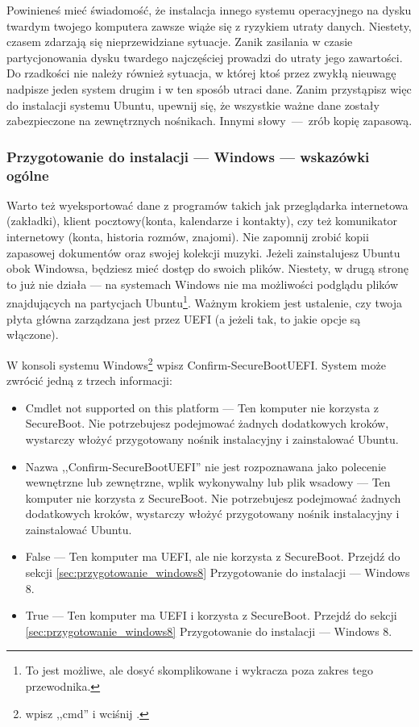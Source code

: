 \label{sec:przygotowanie_windows}Powinieneś mieć świadomość, że instalacja innego systemu operacyjnego na dysku twardym twojego komputera zawsze wiąże się z ryzykiem utraty danych. Niestety, czasem zdarzają się nieprzewidziane sytuacje. Zanik zasilania w czasie partycjonowania dysku twardego najczęściej prowadzi do utraty jego zawartości. Do rzadkości nie należy również sytuacja, w której ktoś przez zwykłą nieuwagę  nadpisze jeden system drugim i w ten sposób utraci dane. Zanim przystąpisz więc do instalacji systemu Ubuntu, upewnij się, że wszystkie ważne dane zostały zabezpieczone na zewnętrznych nośnikach. Innymi słowy~---~zrób kopię zapasową.

\subsubsection{Przygotowanie do instalacji --- Windows --- wskazówki ogólne}
Warto też wyeksportować dane z programów takich jak przeglądarka internetowa (zakładki), klient pocztowy(konta, kalendarze i kontakty), czy też komunikator internetowy (konta, historia rozmów, znajomi). Nie zapomnij zrobić kopii zapasowej dokumentów oraz swojej kolekcji muzyki. Jeżeli zainstalujesz Ubuntu obok Windowsa, będziesz mieć dostęp do swoich plików. Niestety, w drugą stronę to już nie działa --- na systemach Windows nie ma możliwości podglądu plików znajdujących na partycjach Ubuntu\footnote{To jest możliwe, ale dosyć skomplikowane i wykracza poza zakres tego przewodnika.}.
Ważnym krokiem jest ustalenie, czy twoja płyta główna zarządzana jest przez UEFI (a jeżeli tak, to jakie opcje są włączone).

W konsoli systemu Windows\footnote{ wpisz ,,cmd'' i wciśnij \keys{\returnwin}.} wpisz \textcolor{ubuntu_orange}{Confirm-SecureBootUEFI}. System może zwrócić jedną z trzech informacji:
\begin{itemize}
\item \textcolor{ubuntu_orange}{Cmdlet not supported on this platform} --- Ten komputer nie korzysta z SecureBoot. Nie potrzebujesz podejmować żadnych dodatkowych kroków, wystarczy włożyć przygotowany nośnik instalacyjny i zainstalować Ubuntu.
\item \textcolor{ubuntu_orange}{Nazwa ,,Confirm-SecureBootUEFI'' nie jest rozpoznawana jako polecenie wewnętrzne lub zewnętrzne, wplik wykonywalny lub plik wsadowy} --- Ten komputer nie korzysta z SecureBoot. Nie potrzebujesz podejmować żadnych dodatkowych kroków, wystarczy włożyć przygotowany nośnik instalacyjny i zainstalować Ubuntu.
\item \textcolor{ubuntu_orange}{False} --- Ten komputer ma UEFI, ale nie korzysta z SecureBoot. Przejdź do sekcji \ref{sec:przygotowanie_windows8} Przygotowanie do instalacji --- Windows 8.
\item \textcolor{ubuntu_orange}{True} --- Ten komputer ma UEFI i korzysta z SecureBoot. Przejdź do sekcji \ref{sec:przygotowanie_windows8} Przygotowanie do instalacji --- Windows 8.
\end{itemize}
